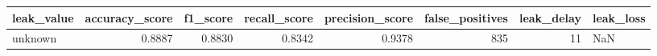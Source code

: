 \begin{tabular}{lrrrrrrl}
\toprule
leak\_value & accuracy\_score & f1\_score & recall\_score & precision\_score & false\_positives & leak\_delay & leak\_loss \\
\midrule
unknown & 0.8887 & 0.8830 & 0.8342 & 0.9378 & 835 & 11 & NaN \\
\bottomrule
\end{tabular}
